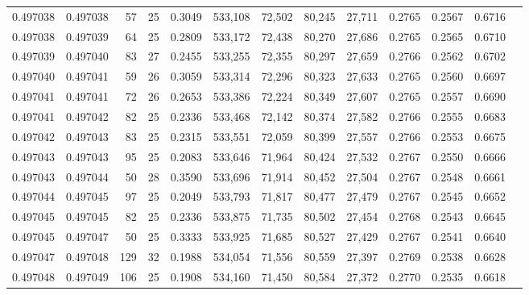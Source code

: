 \begin{tabular}{rrrrrrrrrrrrr}
0.497038 & 0.497038 &  57 &  25 &                                     0.3049 & 533,108 &  72,502 &  80,245 &  27,711 & 0.2765 & 0.2567 & 0.6716 \\
0.497038 & 0.497039 &  64 &  25 &                                     0.2809 & 533,172 &  72,438 &  80,270 &  27,686 & 0.2765 & 0.2565 & 0.6710 \\
0.497039 & 0.497040 &  83 &  27 &                                     0.2455 & 533,255 &  72,355 &  80,297 &  27,659 & 0.2766 & 0.2562 & 0.6702 \\
0.497040 & 0.497041 &  59 &  26 &                                     0.3059 & 533,314 &  72,296 &  80,323 &  27,633 & 0.2765 & 0.2560 & 0.6697 \\
0.497041 & 0.497041 &  72 &  26 &                                     0.2653 & 533,386 &  72,224 &  80,349 &  27,607 & 0.2765 & 0.2557 & 0.6690 \\
0.497041 & 0.497042 &  82 &  25 &                                     0.2336 & 533,468 &  72,142 &  80,374 &  27,582 & 0.2766 & 0.2555 & 0.6683 \\
0.497042 & 0.497043 &  83 &  25 &                                     0.2315 & 533,551 &  72,059 &  80,399 &  27,557 & 0.2766 & 0.2553 & 0.6675 \\
0.497043 & 0.497043 &  95 &  25 &                                     0.2083 & 533,646 &  71,964 &  80,424 &  27,532 & 0.2767 & 0.2550 & 0.6666 \\
0.497043 & 0.497044 &  50 &  28 &                                     0.3590 & 533,696 &  71,914 &  80,452 &  27,504 & 0.2767 & 0.2548 & 0.6661 \\
0.497044 & 0.497045 &  97 &  25 &                                     0.2049 & 533,793 &  71,817 &  80,477 &  27,479 & 0.2767 & 0.2545 & 0.6652 \\
0.497045 & 0.497045 &  82 &  25 &                                     0.2336 & 533,875 &  71,735 &  80,502 &  27,454 & 0.2768 & 0.2543 & 0.6645 \\
0.497045 & 0.497047 &  50 &  25 &                                     0.3333 & 533,925 &  71,685 &  80,527 &  27,429 & 0.2767 & 0.2541 & 0.6640 \\
0.497047 & 0.497048 & 129 &  32 &                                     0.1988 & 534,054 &  71,556 &  80,559 &  27,397 & 0.2769 & 0.2538 & 0.6628 \\
0.497048 & 0.497049 & 106 &  25 &                                     0.1908 & 534,160 &  71,450 &  80,584 &  27,372 & 0.2770 & 0.2535 & 0.6618 \\

\end{tabular}
